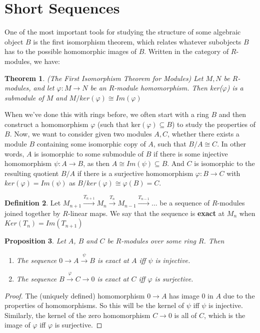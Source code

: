 \documentclass[12pt]{book}
\newtheorem{theorem}{Theorem}[chapter]
\newtheorem{proposition}[theorem]{Proposition}
\theoremstyle{definition}
\newtheorem{definition}[theorem]{Definition}
\begin{document}
\section{Short Sequences}
One of the most important tools for studying the structure of some algebraic object $B$ is the first isomorphism theorem, which relates whatever subobjects $B$ has to the possible homomorphic images of $B$. Written in the category of $R$-modules, we have:
\begin{theorem}
    (The First Isomorphism Theorem for Modules) Let $M,N$ be $R$-modules, and let $\varphi : M \rightarrow N$ be an $R$-module homomorphism. Then ker($\varphi$) is a submodule of $M$ and $M/ker(\varphi) \cong Im(\varphi)$
\end{theorem} 

When we've done this with rings before, we often start with a ring $B$ and then construct a homomorphism $\varphi$ (such that ker$(\varphi) \subseteq B$) to study the properties of $B$. Now, we want to consider given two modules $A, C$, whether there exists a module $B$ containing some isomorphic copy of $A$, such that $B/A \cong C$. In other words, $A$ is isomorphic to some submodule of $B$ if there is some injective homomorphism $\psi : A \rightarrow B$, as then $ A \cong Im(\psi) \subseteq B$. And $C$ is isomorphic to the resulting quotient $B/A$ if there is a surjective homomorphism $\varphi : B \rightarrow C$ with $ker(\varphi) = Im(\psi)$ as $B/ker(\varphi) \cong \varphi(B) = C$.

\begin{definition}
    Let $M_{n+1} \xrightarrow{T_{n+1}} M_n \xrightarrow{T_n} M_{n-1} \xrightarrow{T_{n-1}} \dots$
    be a sequence of $R$-modules joined together by $R$-linear maps. We say that the sequence is \textbf{exact} at $M_n$ when $Ker(T_n) = Im(T_{n+1})$
\end{definition}

\begin{proposition}
    Let $A$, $B$ and $C$ be $R$-modules over some ring $R$. Then 
    \begin{enumerate}
        \item The sequence $0 \rightarrow A \xrightarrow{\psi} B$ is exact at $A$ iff $\psi$ is injective.
        \item The sequence $B \xrightarrow{\varphi} C \rightarrow 0$ is exact at $C$ iff $\varphi$ is surjective.
    \end{enumerate}
\end{proposition}
\begin{proof}
    The (uniquely defined) homomorphism $0 \rightarrow A$ has image $0$ in $A$ due to the properties of homomorphisms. So this will be the kernel of $\psi$ iff $\psi$ is injective. Similarly, the kernel of the zero homomorphism $C \rightarrow 0$ is all of $C$, which is the image of $\varphi$ iff $\varphi$ is surjective. 
\end{proof}
\end{document}
